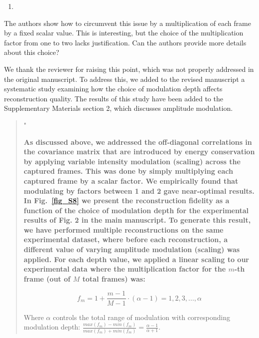 \documentclass[12pt]{article}
\newenvironment{solved_reviewercomment}
    {\begin{tcolorbox}[width=\linewidth,colback=gray!5,colframe=solved_commentcolor!50,title=Reviewer Comment,left=5pt,right=5pt]}
    {\end{tcolorbox}}
\newenvironment{finished_ourresponse}
    {\begin{tcolorbox}[width=\linewidth,breakable,enhanced,colback=gray!5,colframe=finished_responsecolor!50,title=Response,left=5pt,right=5pt]}
    {\end{tcolorbox}}
\begin{document}
    
\begin{enumerate}[label=\arabic*., resume]
\item \leavevmode
\end{enumerate}
\vspace{-1em}
\begin{solved_reviewercomment}
    The authors show how to circumvent this issue by a multiplication of each frame by a fixed scalar value. This is interesting, but the choice of the multiplication factor from one to two lacks justification. Can the authors provide more details about this choice? 
\end{solved_reviewercomment}

\begin{finished_ourresponse}
We thank the reviewer for raising this point, which was not properly addressed in the original manuscript. To address this, we added to the revised manuscript a systematic study examining how the choice of modulation depth affects reconstruction quality. The results of this study have been added to the Supplementary Materials section 2, which discusses amplitude modulation.



\begin{quote}

"{\bfseries
As discussed above, we addressed the off-diagonal correlations in the covariance matrix that are introduced by energy conservation by applying variable intensity modulation (scaling) across the captured frames. This was done by simply multiplying each captured frame by a scalar factor. We empirically found that modulating by factors between 1 and 2 gave near-optimal results. In Fig.~\ref{fig_S8} we present the reconstruction fidelity as a function of the choice of modulation depth for the experimental results of Fig. 2 in the main manuscript. To generate this result, we have performed multiple reconstructions on the same experimental dataset, where before each reconstruction, a different value of varying amplitude modulation (scaling) was applied. For each depth value, we applied a linear scaling to our experimental data where the multiplication factor for the $m$-th frame (out of $M$ total frames) was:


\begin{equation}
    f_m = 1 + \frac{m-1}{M-1} \cdot (\alpha -1) = 1, 2, 3, ..., \alpha
\end{equation}

Where $\alpha$ controls the total range of modulation with corresponding modulation depth: $\frac{max(f_m)-min(f_m)}{max(f_m)+min(f_m)}=\frac{\alpha-1}{\alpha+1}$.

}
\end{quote}
\end{finished_ourresponse}
\end{document}
